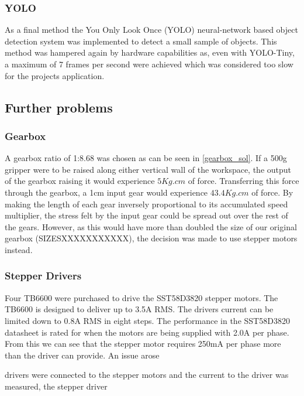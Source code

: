 \documentclass[conference]{IEEEtran}
\begin{document}
\subsubsection{YOLO}
As a final method the You Only Look Once (YOLO) neural-network based object detection system was implemented to detect a small sample of objects. This method was hampered again by hardware capabilities as, even with YOLO-Tiny, a maximum of 7 frames per second were achieved which was considered too slow for the projects application. 

\subsection{Further problems}
\subsubsection{Gearbox}
A gearbox ratio of 1:8.68 was chosen as can be seen in \ref{gearbox_sol}. If a 500g gripper were to be raised along either vertical wall of the workspace, the output of the gearbox raising it would experience $5Kg.cm$ of force. Transferring this force through the gearbox, a 1cm input gear would experience $43.4 Kg.cm$ of force. By making the length of each gear inversely proportional to its accumulated speed multiplier, the stress felt by the input gear could be spread out over the rest of the gears. However, as this would have more than doubled the size of our original gearbox (SIZESXXXXXXXXXXX), the decision was made to use stepper motors instead.
\subsubsection{Stepper Drivers}
Four TB6600 were purchased to drive the SST58D3820 stepper motors. The TB6600 is designed to deliver up to 3.5A RMS. The drivers current can be limited down to 0.8A RMS in eight steps. The performance in the SST58D3820 datasheet is rated for when the motors are being supplied with 2.0A per phase. From this we can see that the stepper motor requires 250mA per phase more than the driver can provide. 
An issue arose 

drivers were connected to the stepper motors and the current to the driver was measured, the stepper driver 
\end{document}
